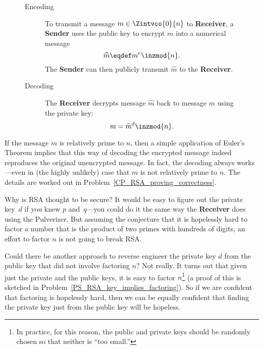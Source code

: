 \begin{figure}[p]
{\begin{minipage}{\textwidth}
\begin{description}
\item[Encoding]

\iffalse

Given a message~$m$, the sender first checks that $\gcd(m, n) =
1$.\footnote{It would be very bad if $\gcd(m, n)$ equals $p$ or $q$
  since then it would be easy for someone to use the encoded message
  to compute the private key If $\gcd(m, n) = n$, then the encoded
  message would be~0, which is fairly useless.  For very large values
  of~$n$, it is extremely unlikely that $\gcd(m, n) \ne 1$.  If this
  does happen, you should get a new set of keys or, at the very least,
  add some bits to~$m$ so that the resulting message is relatively
  prime to~$n$.}
\fi

To transmit a message $m \in \Zintvco{0}{n}$ to \textbf{Receiver}, a
  \textbf{Sender} uses the public key to encrypt $m$ into a numerical
  message
\[
\widehat{m} \eqdef m^e \inzmod{n}. %
\]
The \textbf{Sender} can then publicly transmit $\widehat{m}$ to the \textbf{Receiver}.

\item[Decoding] The \textbf{Receiver} decrypts message $\widehat{m}$ back to message $m$ using the
  private key:
\[
m = \widehat{m}^d \inzmod{n}. %
\]
\end{description}

\end{minipage}
}
\end{figure}

If the message $m$ is relatively prime to $n$, then a simple
application of Euler's Theorem implies that this way of decoding the
encrypted message indeed reproduces the original unencrypted message.
In fact, the decoding always works---even in (the highly unlikely)
case that $m$ is not relatively prime to $n$.  The details are worked
out in Problem~\ref{CP_RSA_proving_correctness}.

Why is RSA thought to be secure?  It would be easy to figure out the
private key~$d$ if you knew $p$ and~$q$---you could do it the same
way the \textbf{Receiver} does using the Pulverizer.  But assuming the
conjecture that it is hopelessly hard to factor a number that is the
product of two primes with hundreds of digits, an effort to factor $n$
is not going to break RSA.

Could there be another approach to reverse engineer the private key
$d$ from the public key that did not involve factoring $n$?  Not
really.  It turns out that given just the private and the public keys,
it is easy to factor $n$\footnote{In practice, for this reason, the
  public and private keys should be randomly chosen so that neither is
  ``too small.''}  (a proof of this is sketched in
Problem~\ref{PS_RSA_key_implies_factoring}).  So if we are confident
that factoring is hopelessly hard, then we can be equally confident
that finding the private key just from the public key will be
hopeless.

